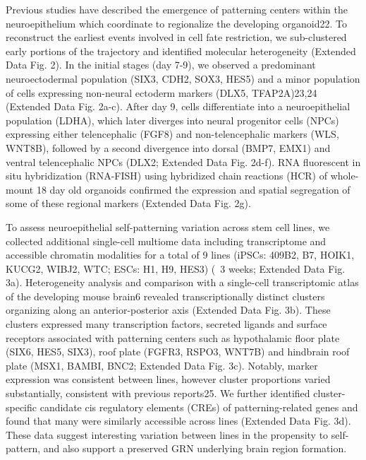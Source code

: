 Previous studies have described the emergence of patterning centers within the neuroepithelium which coordinate to regionalize the developing organoid22. To reconstruct the earliest events involved in cell fate restriction, we sub-clustered early portions of the trajectory and identified molecular heterogeneity (Extended Data Fig. 2). In the initial stages (day 7-9), we observed a predominant neuroectodermal population (SIX3, CDH2, SOX3, HES5) and a minor population of cells expressing non-neural ectoderm markers (DLX5, TFAP2A)23,24 (Extended Data Fig. 2a-c). After day 9, cells differentiate into a neuroepithelial population (LDHA), which later diverges into neural progenitor cells (NPCs) expressing either telencephalic (FGF8) and non-telencephalic markers (WLS, WNT8B), followed by a second divergence into dorsal (BMP7, EMX1) and ventral telencephalic NPCs (DLX2; Extended Data Fig. 2d-f). RNA fluorescent in situ hybridization (RNA-FISH) using hybridized chain reactions (HCR) of whole-mount 18 day old organoids confirmed the expression and spatial segregation of some of these regional markers (Extended Data Fig. 2g).

To assess neuroepithelial self-patterning variation across stem cell lines, we collected additional single-cell multiome data including transcriptome and accessible chromatin modalities for a total of 9 lines (iPSCs: 409B2, B7, HOIK1, KUCG2, WIBJ2, WTC; ESCs: H1, H9, HES3) (~3 weeks; Extended Data Fig. 3a). Heterogeneity analysis and comparison with a single-cell transcriptomic atlas of the developing mouse brain6 revealed transcriptionally distinct clusters organizing along an anterior-posterior axis (Extended Data Fig. 3b). These clusters expressed many transcription factors, secreted ligands and surface receptors associated with patterning centers such as hypothalamic floor plate (SIX6, HES5, SIX3), roof plate (FGFR3, RSPO3, WNT7B) and hindbrain roof plate (MSX1, BAMBI, BNC2; Extended Data Fig. 3c). Notably, marker expression was consistent between lines, however cluster proportions varied substantially, consistent with previous reports25. We further identified cluster-specific candidate cis regulatory elements (CREs) of patterning-related genes and found that many were similarly accessible across lines (Extended Data Fig. 3d). These data suggest interesting variation between lines in the propensity to self-pattern, and also support a preserved GRN underlying brain region formation.


